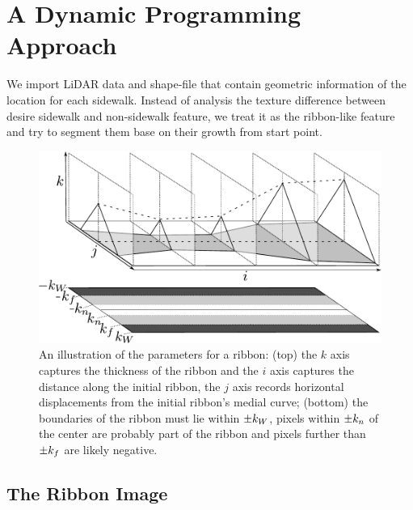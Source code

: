 \chapter{A Dynamic Programming Approach}

We import LiDAR data and shape-file that contain geometric information of the location for each sidewalk. Instead of analysis the texture difference between desire sidewalk and non-sidewalk feature, we treat it as the ribbon-like feature and try to segment them base on their growth from start point. 


\begin{figure}[htb]
    \centering
    \includegraphics[width=0.95\columnwidth]{Figures/ribbon-3d-combined.pdf}
    \caption[3D Ribbon Image]{An illustration of the parameters for a ribbon: (top) the $k$ axis captures the thickness of the ribbon and the $i$ axis captures the distance along the initial ribbon, the $j$ axis records horizontal displacements from the initial ribbon's medial curve; (bottom) the boundaries of the ribbon must lie within $\pm k_W{}$, pixels within $\pm k_n{}$ of the center are probably part of the ribbon and pixels further than $\pm k_f{}$ are likely negative. }
    \label{fig:ribbon_3d}
\end{figure}

\section{The Ribbon Image}

